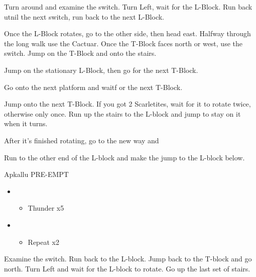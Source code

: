 Turn around and examine the switch. Turn Left, wait for the L-Block. Run back utnil the next switch, run back to the next L-Block. 

Once the L-Block rotates, go to the other side, then head east. Halfway through the long walk use the Cactuar. Once the T-Block faces north or west, use the switch. Jump on the T-Block and onto the stairs.

Jump on the stationary L-Block, then go for the next T-Block.

Go onto the next platform and waitf or the next T-Block. 

Jump onto the next T-Block. If you got 2 Scarletites, wait for it to rotate twice, otherwise only once. Run up the stairs to the L-block and jump to stay on it when it turns.

After it's finished rotating, go to the new way and 

Run to the other end of the L-block and make the jump to the L-block below.

\begin{battle}{Apkallu PRE-EMPT}
\begin{flushleft}
\begin{itemize}
	\item \sixth
	\begin{itemize}
		\item Thunder x5
	\end{itemize}
	\item \fifth
	\begin{itemize}
		\item Repeat x2
	\end{itemize}
\end{itemize}
\end{flushleft}
\end{battle}

Examine the switch. Run back to the L-block. Jump back to the T-block and go north. Turn Left and wait for the L-block to rotate. Go up the last set of stairs.

